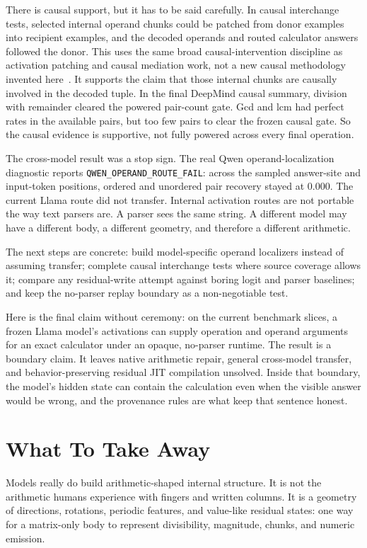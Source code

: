 \documentclass[acmsmall,screen,nonacm]{acmart}
\begin{document}
There is causal support, but it has to be said carefully. In causal interchange
tests, selected internal operand chunks could be patched from donor examples
into recipient examples, and the decoded operands and routed calculator answers
followed the donor. This uses the same broad causal-intervention discipline as
activation patching and causal mediation work, not a new causal methodology
invented here~\cite{stolfo2023,zhang2023patching}. It supports the claim that
those internal chunks are causally involved in the decoded tuple. In the final
DeepMind causal summary, division with remainder cleared the powered pair-count
gate. Gcd and lcm had perfect rates in the available pairs, but too few pairs
to clear the frozen causal gate. So the causal evidence is supportive, not
fully powered across every final operation.

The cross-model result was a stop sign. The real Qwen operand-localization
diagnostic reports \texttt{QWEN\_OPERAND\_ROUTE\_FAIL}: across the sampled
answer-site and input-token positions, ordered and unordered pair recovery
stayed at 0.000. The current Llama route did not transfer. Internal activation
routes are not portable the way text parsers are. A parser sees the same string.
A different model may have a different body, a different geometry, and
therefore a different arithmetic.

The next steps are concrete: build model-specific operand localizers instead of
assuming transfer; complete causal interchange tests where source coverage
allows it; compare any residual-write attempt against boring logit and parser
baselines; and keep the no-parser replay boundary as a non-negotiable test.

Here is the final claim without ceremony: on the current benchmark slices, a
frozen Llama model's activations can supply operation and operand arguments for
an exact calculator under an opaque, no-parser runtime. The result is a boundary
claim. It leaves native arithmetic repair, general cross-model transfer, and
behavior-preserving residual JIT compilation unsolved. Inside that boundary, the
model's hidden state can contain the calculation even when the visible answer
would be wrong, and the provenance rules are what keep that sentence honest.

\section{What To Take Away}

Models really do build arithmetic-shaped internal structure. It is not the
arithmetic humans experience with fingers and written columns. It is a geometry
of directions, rotations, periodic features, and value-like residual states: one
way for a matrix-only body to represent divisibility, magnitude, chunks, and
numeric emission.
\end{document}
